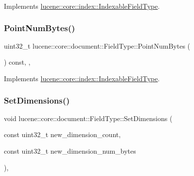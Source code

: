 Implements \mbox{\hyperlink{classlucene_1_1core_1_1index_1_1IndexableFieldType_a14e8fab7ab6c22ed05a9049767b88e4b}{lucene\+::core\+::index\+::\+Indexable\+Field\+Type}}.

\mbox{\label{classlucene_1_1core_1_1document_1_1FieldType_af4b18f524ccaa560b6ba667f153c5880}} 
\subsubsection{\texorpdfstring{Point\+Num\+Bytes()}{PointNumBytes()}}
{\footnotesize\ttfamily uint32\+\_\+t lucene\+::core\+::document\+::\+Field\+Type\+::\+Point\+Num\+Bytes (\begin{DoxyParamCaption}{ }\end{DoxyParamCaption}) const\hspace{0.3cm}{\ttfamily [inline]}, {\ttfamily [virtual]}, {\ttfamily [noexcept]}}



Implements \mbox{\hyperlink{classlucene_1_1core_1_1index_1_1IndexableFieldType_aaf9f4d10246fa5e7b0265d11774883ef}{lucene\+::core\+::index\+::\+Indexable\+Field\+Type}}.

\mbox{\label{classlucene_1_1core_1_1document_1_1FieldType_a17e71a728e6e6ec2271ec9a2f4fc7398}} 
\subsubsection{\texorpdfstring{Set\+Dimensions()}{SetDimensions()}}
{\footnotesize\ttfamily void lucene\+::core\+::document\+::\+Field\+Type\+::\+Set\+Dimensions (\begin{DoxyParamCaption}\item[{const uint32\+\_\+t}]{new\+\_\+dimension\+\_\+count,  }\item[{const uint32\+\_\+t}]{new\+\_\+dimension\+\_\+num\+\_\+bytes }\end{DoxyParamCaption})\hspace{0.3cm}{\ttfamily [inline]}, {\ttfamily [noexcept]}}

